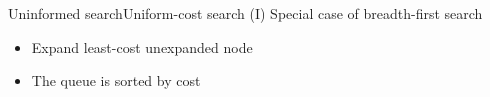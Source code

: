 \documentclass[10pt,compress]{beamer} %
\begin{document}
\begin{frame}{Uninformed search}{Uniform-cost search (I)}
    Special case of breadth-first search
    \begin{itemize}
        \item Expand least-cost unexpanded node
        \item The queue is sorted by cost
    \end{itemize}

    \begin{columns}
                \setlength{\fboxrule}{0pt}
                \setlength{\fboxrule}{0pt}
    \end{columns}
\end{frame}
\end{document}
